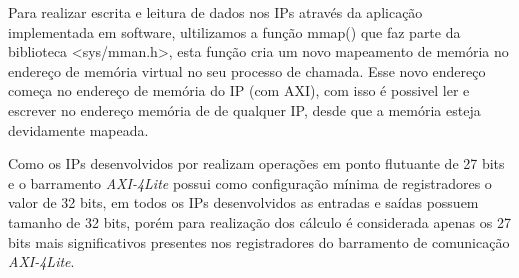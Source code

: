 Para realizar escrita e leitura de dados nos IPs através da aplicação implementada em software, ultilizamos a função mmap() que faz parte da biblioteca <sys/mman.h>, esta função cria um novo mapeamento de memória no endereço de memória virtual no seu processo de chamada. Esse novo endereço começa no endereço de memória do IP (com AXI), com isso é possivel ler e escrever no endereço memória de de qualquer IP, desde que a memória esteja devidamente mapeada.

Como os IPs desenvolvidos por \cite{munoz2010tradeoff} realizam operações em ponto flutuante de 27 bits e o barramento \textit{AXI-4Lite} possui como configuração mínima de registradores o valor de 32 bits, em todos os IPs desenvolvidos as entradas e saídas possuem tamanho de 32 bits, porém para realização dos cálculo é considerada apenas os 27 bits mais significativos presentes nos registradores do barramento de comunicação \textit{AXI-4Lite}.
\vspace{\onelineskip}

